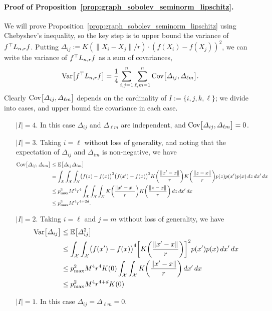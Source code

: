 \paragraph{Proof of Proposition~\ref{prop:graph_sobolev_seminorm_lipschitz}.}
We will prove Proposition~\ref{prop:graph_sobolev_seminorm_lipschitz} using Chebyshev's inequality, so the key step is to upper bound the variance of $f^{\top}L_{n,r}f$. Putting $\varDelta_{ij} := K(\|X_i - X_j\|/r) \cdot (f(X_i) - f(X_j))^2$, we can write the variance of $f^{\top} L_{n,r} f$ as a sum of covariances,
\begin{equation*}
\mathrm{Var}\bigl[f^{\top} L_{n,r} f\bigr] = \frac{1}{4} \sum_{i, j = 1}^{n} \sum_{\ell,m = 1}^{n} \mathrm{Cov}\bigl[\varDelta_{ij},\varDelta_{\ell m}\bigr].
\end{equation*}
Clearly $\mathrm{Cov}\bigl[\varDelta_{ij},\varDelta_{\ell m}\bigr]$ depends on the cardinality of $I := \{i,j,k,\ell\}$; we divide into cases, and upper bound the covariance in each case.
\begin{enumerate}
	\item[$\bigl|I\bigr| = 4$.] In this case $\varDelta_{ij}$ and $\varDelta_{\ell m}$ are independent, and $\mathrm{Cov}\bigl[\varDelta_{ij},\varDelta_{\ell m}\bigr] = 0$.
	\item[$\bigl|I\bigr| = 3$.] Taking $i = \ell$ without loss of generality, and noting that the expectation of $\Delta_{ij}$ and $\Delta_{im}$ is non-negative, we have
	\begin{align*}
	\mathrm{Cov}\bigl[\varDelta_{ij},\varDelta_{i m}\bigr] & \leq \mathbb{E}\bigl[\varDelta_{ij} \varDelta_{i m} \bigr] \\
	& = \int_{\mathcal{X}} \int_{\mathcal{X}} \int_{\mathcal{X}} \bigl(f(z) - f(x)\bigr)^2 \bigl(f(x') - f(x)\bigr)^2 K\biggl(\frac{\|x' - x\|}{r}\biggr) K\biggl(\frac{\|z - x\|}{r}\biggr) p(z) p(x') p(x) \,dz \,dx' \,dx \\
	& \leq p_{\max}^3 M^4 r^4 \int_{\mathcal{X}} \int_{\mathcal{X}} \int_{\mathcal{X}} K\biggl(\frac{\|x' - x\|}{r}\biggr) K\biggl(\frac{\|z - x\|}{r}\biggr) \,dz \,dx' \,dx \\
	& \leq p_{\max}^3 M^4 r^{4 + 2d}.
	\end{align*}
	\item[$\bigl|I\bigr| = 2$.] Taking $i = \ell$ and $j = m$ without loss of generality, we have
	\begin{align*}
	\mathrm{Var}\bigl[\varDelta_{ij}\bigr] & \leq \mathbb{E}\bigl[\varDelta_{ij}^2\bigr] \\
	& \leq \int_{\mathcal{X}} \int_{\mathcal{X}} \bigl(f(x') - f(x)\bigr)^4 \biggl[K\biggl(\frac{\|x' - x\|}{r}\biggr)\biggr]^2 p(x') p(x) \,dx' \,dx \\
	& \leq p_{\max}^2 M^4 r^4 K(0) \int_{\mathcal{X}} \int_{\mathcal{X}} K\biggl(\frac{\|x' - x\|}{r}\biggr) \,dx' \,dx \\
	& \leq p_{\max}^2 M^4 r^{4 + d} K(0)
	\end{align*}
	\item[$\bigl|I\bigr| = 1$.] In this case $\varDelta_{i j} = \varDelta_{\ell m} = 0$.
\end{enumerate}
